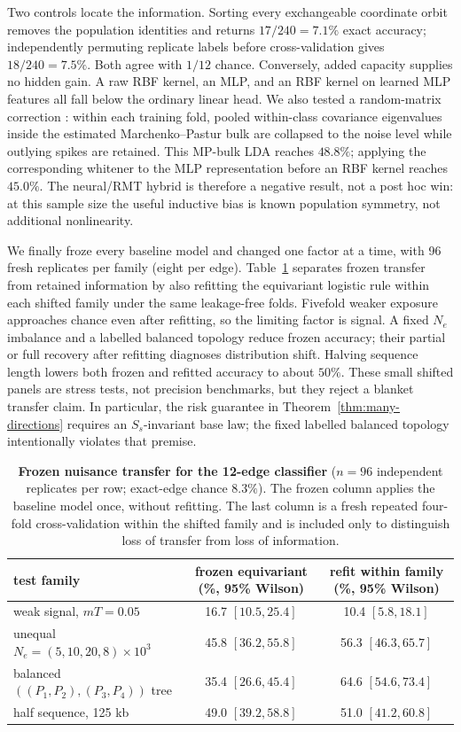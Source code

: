 \documentclass[11pt]{article}
\theoremstyle{plain}
\theoremstyle{definition}
\theoremstyle{remark}
\begin{document}
Two controls locate the information. Sorting every exchangeable coordinate orbit removes the
population identities and returns $17/240=7.1\%$ exact accuracy; independently permuting replicate
labels before cross-validation gives $18/240=7.5\%$. Both agree with $1/12$ chance. Conversely,
added capacity supplies no hidden gain. A raw RBF kernel, an MLP, and an RBF kernel on learned MLP
features all fall below the ordinary linear head. We also tested a random-matrix correction
\citep{marchenko1967distribution}: within each training fold, pooled within-class covariance
eigenvalues inside the estimated Marchenko--Pastur bulk are collapsed to the noise level while
outlying spikes are retained. This MP-bulk LDA reaches $48.8\%$; applying the corresponding
whitener to the MLP representation before an RBF kernel reaches $45.0\%$. The neural/RMT hybrid is
therefore a negative result, not a post hoc win: at this sample size the useful inductive bias is
known population symmetry, not additional nonlinearity.

We finally froze every baseline model and changed one factor at a time, with 96 fresh replicates
per family (eight per edge). Table~\ref{tab:twelve-direction-transfer} separates frozen transfer
from retained information by also refitting the equivariant logistic rule within each shifted
family under the same leakage-free folds. Fivefold weaker exposure approaches chance even after
refitting, so the limiting factor is signal. A fixed $N_e$ imbalance and a labelled balanced
topology reduce frozen accuracy; their partial or full recovery after refitting diagnoses
distribution shift. Halving sequence length lowers both frozen and refitted accuracy to about
$50\%$. These small shifted panels are stress tests, not precision benchmarks, but they reject a
blanket transfer claim. In particular, the risk guarantee in Theorem~\ref{thm:many-directions}
requires an $S_s$-invariant base law; the fixed labelled balanced topology intentionally violates
that premise.

\begin{table}[H]
\centering
\scriptsize
\begin{tabular}{lcc}
\toprule
test family & frozen equivariant (\%, 95\% Wilson) & refit within family (\%, 95\% Wilson) \\
\midrule
weak signal, $mT=0.05$ & 16.7 $[10.5,25.4]$ & 10.4 $[5.8,18.1]$ \\
unequal $N_e=(5,10,20,8)\times10^3$ & 45.8 $[36.2,55.8]$ & 56.3 $[46.3,65.7]$ \\
balanced $((P_1,P_2),(P_3,P_4))$ tree & 35.4 $[26.6,45.4]$ & 64.6 $[54.6,73.4]$ \\
half sequence, 125 kb & 49.0 $[39.2,58.8]$ & 51.0 $[41.2,60.8]$ \\
\bottomrule
\end{tabular}
\caption{\textbf{Frozen nuisance transfer for the 12-edge classifier} ($n=96$ independent
replicates per row; exact-edge chance $8.3\%$). The frozen column applies the baseline model once,
without refitting. The last column is a fresh repeated four-fold cross-validation within the
shifted family and is included only to distinguish loss of transfer from loss of information.}
\label{tab:twelve-direction-transfer}
\end{table}
\end{document}
